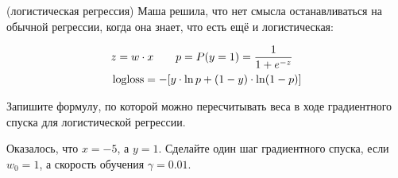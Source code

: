\begin{problem}{(логистическая регрессия)}
Маша решила, что нет смысла останавливаться на обычной регрессии, когда она знает, что есть ещё и логистическая:

\begin{equation*}
\begin{aligned}
& z  = w \cdot x \qquad p = P(y = 1) = \frac{1}{1 + e^{-z}} \\
& \operatorname{logloss} = -[ y \cdot \ln p + (1 - y) \cdot \ln (1 - p) ]
\end{aligned}
\end{equation*}

Запишите формулу, по которой можно пересчитывать веса в ходе градиентного спуска для логистической регрессии. 

Оказалось, что $x = -5$, а $y = 1$. Сделайте один шаг градиентного спуска, если $w_0 = 1$, а скорость обучения $\gamma = 0.01$. 
\end{problem}

